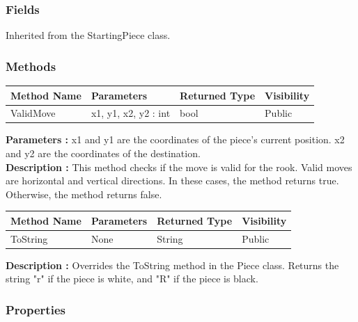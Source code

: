 \documentclass[12pt]{article}
\begin{document}
    \subsubsection{Fields}

    Inherited from the StartingPiece class.

    \subsubsection{Methods}

    \begin{table}[H]
        \begin{tabular}{|l|l|l|l|}
            \hline
            \rowcolor[HTML]{EFEFEF}
            \cellcolor[HTML]{EFEFEF}\textbf{Method Name} & \textbf{Parameters}  & \textbf{Returned Type} & \textbf{Visibility} \\ \hline
            ValidMove                                    & x1, y1, x2, y2 : int & bool                   & Public              \\ \hline
        \end{tabular}
    \end{table}

    \textbf{Parameters :} x1 and y1 are the coordinates of the piece's current position. x2 and y2 are the coordinates of the destination.
    \\
    \textbf{Description :} This method checks if the move is valid for the rook.
    Valid moves are horizontal and vertical directions.
    In these cases, the method returns true.
    Otherwise, the method returns false.
    \begin{table}[H]
        \begin{tabular}{|l|l|l|l|}
            \hline
            \rowcolor[HTML]{EFEFEF}
            \cellcolor[HTML]{EFEFEF}\textbf{Method Name} & \textbf{Parameters} & \textbf{Returned Type} & \textbf{Visibility} \\ \hline
            ToString                                     & None                & String                 & Public              \\ \hline
        \end{tabular}
    \end{table}

    \textbf{Description :} Overrides the ToString method in the Piece class.
    Returns the string "r" if the piece is white, and "R" if the piece is black.

    \subsubsection{Properties}
\end{document}
